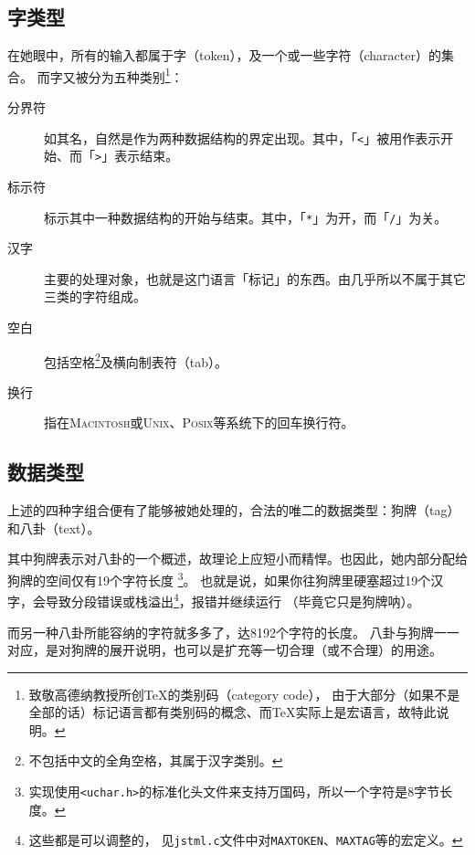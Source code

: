 \documentclass[twoside]{ltjsarticle}
\begin{document}
\subsection{字类型}
在她眼中，所有的输入都属于字（token），及一个或一些字符（character）的集合。
而字又被分为五种类别\footnote{致敬高德纳教授所创{\TeX}的类别码（category code），
由于大部分（如果不是全部的话）标记语言都有类别码的概念、而{\TeX}实际上是宏语言，故特此说明。}：
\begin{description}
  \item[分界符] 如其名，自然是作为两种数据结构的界定出现。其中，「\texttt{<}」被用作表示开始、而「\texttt{>}」表示结束。
  \item[标示符] 标示其中一种数据结构的开始与结束。其中，「\texttt{*}」为开，而「\texttt{/}」为关。
  \item[汉字] 主要的处理对象，也就是这门语言「标记」的东西。由几乎所以不属于其它三类的字符组成。
  \item[空白] 包括空格\footnote{不包括中文的全角空格，其属于汉字类别。}及横向制表符（tab）。
  \item[换行] 指在{\scshape Macintosh}或{\scshape Unix}、{\scshape Posix}等系统下的回车换行符。
\end{description}\par
\subsection{数据类型}
上述的四种字组合便有了能够被她处理的，合法的唯二的数据类型：狗牌（tag）和八卦（text）。\par
其中狗牌表示对八卦的一个概述，故理论上应短小而精悍。也因此，她内部分配给狗牌的空间仅有19个字符长度
\footnote{实现使用\texttt{<uchar.h>}的标准化头文件来支持万国码，所以一个字符是8字节长度。}。
也就是说，如果你往狗牌里硬塞超过19个汉字，会导致分段错误或栈溢出\footnote{这些都是可以调整的，
见\texttt{jstml.c}文件中对\texttt{MAXTOKEN}、\texttt{MAXTAG}等的宏定义。}，报错并继续运行
（毕竟它只是狗牌呐）。\par
而另一种八卦所能容纳的字符就多多了，达8192个字符的长度。
八卦与狗牌一一对应，是对狗牌的展开说明，也可以是扩充等一切合理（或不合理）的用途。
\end{document}

